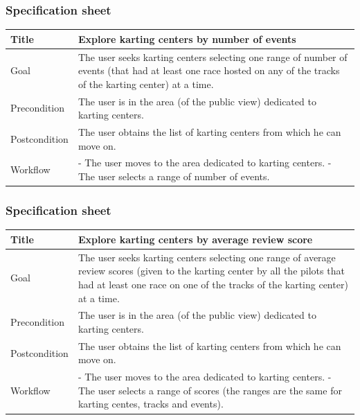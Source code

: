 \documentclass{beamer}
\begin{document}
\begin{frame}
    \frametitle{Specification sheet}
    \begin{table}
        \tiny
        \begin{tabular}{|p{2cm}|p{6cm}|}
        \hline
        Title & \textbf{Explore karting centers by number of events} \\
        \hline
        Goal & The user seeks karting centers selecting one range of number of events (that had
        at least one race hosted on 
        any of the tracks of the karting center) at a time. \\
        \hline
        Precondition & The user is in the area (of the public view) dedicated to karting centers.\\
        \hline
        Postcondition & The user obtains the list of karting centers from which he can move on.\\
        \hline
        Workflow &
        - The user moves to the area dedicated to karting centers. \newline
        - The user selects a range of number of events. \\
        \hline
        \end{tabular}
\end{table}
\end{frame}

\begin{frame}
    \frametitle{Specification sheet}
    \begin{table}
        \tiny
        \begin{tabular}{|p{2cm}|p{6cm}|}
        \hline
        Title & \textbf{Explore karting centers by average review score} \\
        \hline
        Goal & The user seeks karting centers selecting one range of average review scores (given to the karting center by all the pilots
        that had at least one race on one of the tracks of the karting center) at a time. \\
        \hline
        Precondition & The user is in the area (of the public view) dedicated to karting centers.\\
        \hline
        Postcondition & The user obtains the list of karting centers from which he can move on.\\
        \hline
        Workflow &
        - The user moves to the area dedicated to karting centers. \newline
        - The user selects a range of scores (the ranges are the same for karting centes, tracks and events). \\
        \hline
        \end{tabular}
\end{table}
\end{frame}
\end{document}
